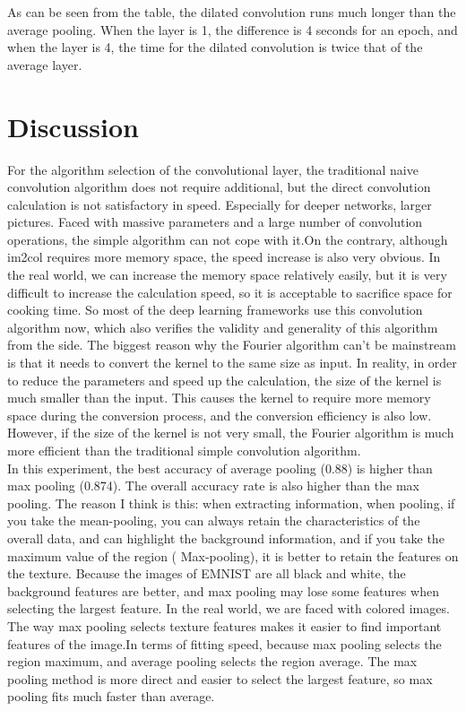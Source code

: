 \documentclass{article}
\begin{document}
As can be seen from the table, the dilated convolution runs much longer than the average pooling. When the layer is 1, the difference is 4 seconds for an epoch, and when the layer is 4, the time for the dilated convolution is twice that of the average layer.

\section{Discussion}

For the algorithm selection of the convolutional layer, the traditional naive convolution algorithm does not require additional, but the direct convolution calculation is not satisfactory in speed. Especially for deeper networks, larger pictures. Faced with massive parameters and a large number of convolution operations, the simple algorithm can not cope with it.On the contrary, although im2col requires more memory space, the speed increase is also very obvious. In the real world, we can increase the memory space relatively easily, but it is very difficult to increase the calculation speed, so it is acceptable to sacrifice space for cooking time. So most of the deep learning frameworks use this convolution algorithm now, which also verifies the validity and generality of this algorithm from the side.
The biggest reason why the Fourier algorithm can't be mainstream is that it needs to convert the kernel to the same size as input. In reality, in order to reduce the parameters and speed up the calculation, the size of the kernel is much smaller than the input. This causes the kernel to require more memory space during the conversion process, and the conversion efficiency is also low. However, if the size of the kernel is not very small, the Fourier algorithm is much more efficient than the traditional simple convolution algorithm\cite{deeplearning2016}.\\
In this experiment, the best accuracy of average pooling (0.88) is higher than max pooling (0.874). The overall accuracy rate is also higher than the max pooling. The reason I think is this: when extracting information, when pooling, if you take the mean-pooling, you can always retain the characteristics of the overall data, and can highlight the background information, and if you take the maximum value of the region ( Max-pooling), it is better to retain the features on the texture. Because the images of EMNIST are all black and white, the background features are better, and max pooling may lose some features when selecting the largest feature. In the real world, we are faced with colored images. The way max pooling selects texture features makes it easier to find important features of the image.In terms of fitting speed, because max pooling selects the region maximum, and average pooling selects the region average. The max pooling method is more direct and easier to select the largest feature, so max pooling fits much faster than average.\\
\end{document}
